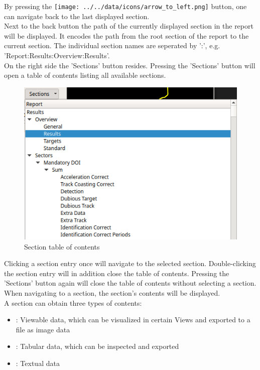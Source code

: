 By pressing the \texttt{[image: ../../data/icons/arrow\_to\_left.png]} button,
one can navigate back to the last displayed section. \\

Next to the back button the path of the currently displayed section in the report will be displayed.
It encodes the path from the root section of the report to the current section. The individual section names are 
seperated by ':', e.g. 'Report:Results:Overview:Results'. \\

On the right side the 'Sections' button resides. Pressing the 'Sections' button will open a table of 
contents listing all available sections.

\begin{figure}[H]
    \hspace*{-2.5cm}
    \center
    \includegraphics[width=12cm,frame]{figures/section_button.png}
  \caption{Section table of contents}
\end{figure}

Clicking a section entry once will navigate to the selected section. Double-clicking the section entry will 
in addition close the table of contents. Pressing the 'Sections' button again will close the table of contents
without selecting a section. \\

When navigating to a section, the section's contents will be displayed. \\

A section can obtain three types of contents:

\begin{itemize}  
    \item {}: Viewable data, which can be visualized in certain Views and exported to a file as image data
    \item {}: Tabular data, which can be inspected and exported
    \item {}: Textual data
\end{itemize}
\ \\

